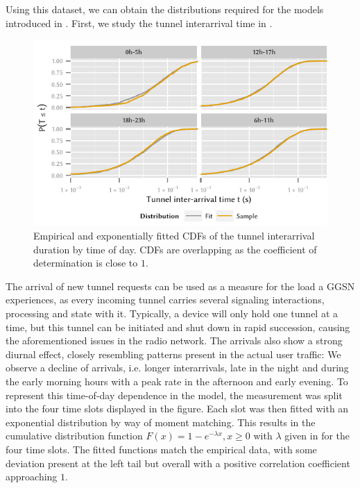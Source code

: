 Using this dataset, we can obtain the distributions required for the models introduced in .
First, we study the tunnel interarrival time in .

\begin{figure}
  \centering
  \includegraphics{cloud/virtualized_network_functions/measurement_data/figures/tunnel_iat}
  \caption{Empirical and exponentially fitted CDFs of the tunnel interarrival duration by time of day. CDFs are overlapping as the coefficient of determination is close to \(1\).}
  \label{fig:cloud:virtualized_network_functions:measurement_data:evaluation:tunnel_iat}
\end{figure}

The arrival of new tunnel requests can be used as a measure for the load a \gls{GGSN} experiences, as every incoming tunnel carries several signaling interactions, processing and state with it.
Typically, a device will only hold one tunnel at a time, but this tunnel can be initiated and shut down in rapid succession, causing the aforementioned issues in the radio network.
The arrivals also show a strong diurnal effect, closely resembling patterns present in the actual user traffic:
We observe a decline of arrivals, i.e. longer interarrivals, late in the night and during the early morning hours with a peak rate in the afternoon and early evening.
To represent this time-of-day dependence in the model, the measurement was split into the four time slots displayed in the figure.
Each slot was then fitted with an exponential distribution by way of moment matching.
This results in the cumulative distribution function \(F(x) = 1- e^{-\lambda x}, x \geq 0\) with \(\lambda\) given in  for the four time slots.
The fitted functions match the empirical data, with some deviation present at the left tail but overall with a positive correlation coefficient approaching \(1\).


